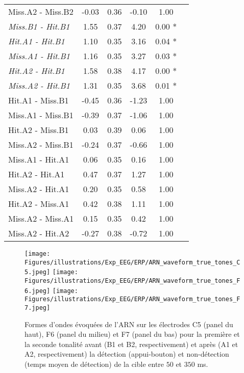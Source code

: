 \begin{landscape}
\begin{table}
\begin{multicols}{3}
\begin{tabular}{|l||*{5}{c|}}
Miss.A2 - Miss.B2 & -0.03 & 0.36 & -0.10 & 1.00 \\ 
\textit{Miss.B1 - Hit.B1} & 1.55 & 0.37 & 4.20 & 0.00 * \\ 
\textit{Hit.A1 - Hit.B1} & 1.10 & 0.35 & 3.16 & 0.04 * \\ 
\textit{Miss.A1 - Hit.B1} & 1.16 & 0.35 & 3.27 & 0.03 * \\ 
\textit{Hit.A2 - Hit.B1} & 1.58 & 0.38 & 4.17 & 0.00 * \\ 
\textit{Miss.A2 - Hit.B1} & 1.31 & 0.35 & 3.68 & 0.01 * \\ 
Hit.A1 - Miss.B1 & -0.45 & 0.36 & -1.23 & 1.00 \\ 
Miss.A1 - Miss.B1 & -0.39 & 0.37 & -1.06 & 1.00 \\ 
Hit.A2 - Miss.B1 & 0.03 & 0.39 & 0.06 & 1.00 \\ 
Miss.A2 - Miss.B1 & -0.24 & 0.37 & -0.66 & 1.00 \\ 
Miss.A1 - Hit.A1 & 0.06 & 0.35 & 0.16 & 1.00 \\ 
Hit.A2 - Hit.A1 & 0.47 & 0.37 & 1.27 & 1.00 \\ 
Miss.A2 - Hit.A1 & 0.20 & 0.35 & 0.58 & 1.00 \\ 
Hit.A2 - Miss.A1 & 0.42 & 0.38 & 1.11 & 1.00 \\ 
Miss.A2 - Miss.A1 & 0.15 & 0.35 & 0.42 & 1.00 \\ 
Miss.A2 - Hit.A2 & -0.27 & 0.38 & -0.72 & 1.00 \\ 
\hline
\end{tabular}
\end{multicols}
\end{table}
\end{landscape}

\begin{figure*}[!t]
\centering
\texttt{[image: Figures/illustrations/Exp\_EEG/ERP/ARN\_waveform\_true\_tones\_C5.jpeg]}
\texttt{[image: Figures/illustrations/Exp\_EEG/ERP/ARN\_waveform\_true\_tones\_F6.jpeg]}
\texttt{[image: Figures/illustrations/Exp\_EEG/ERP/ARN\_waveform\_true\_tones\_F7.jpeg]}
\caption[Formes d'ondes évoquées de l'ARN sur C5, F6 et F7 entre $50$ et $350$ ms]{Formes d'ondes évoquées de l'ARN sur les électrodes C5 (panel du haut), F6 (panel du milieu) et F7 (panel du bas) pour la première et la seconde tonalité avant (B1 et B2, respectivement) et après (A1 et A2, respectivement) la détection (appui-bouton) et non-détection (temps moyen de détection) de la cible entre $50$ et $350$ ms.}
\label{fig:figure5ARNwaveforms}
\end{figure*}


